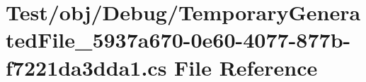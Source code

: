\hypertarget{_test_2obj_2_debug_2_temporary_generated_file__5937a670-0e60-4077-877b-f7221da3dda1_8cs}{}\section{Test/obj/\+Debug/\+Temporary\+Generated\+File\+\_\+5937a670-\/0e60-\/4077-\/877b-\/f7221da3dda1.cs File Reference}
\label{_test_2obj_2_debug_2_temporary_generated_file__5937a670-0e60-4077-877b-f7221da3dda1_8cs}
